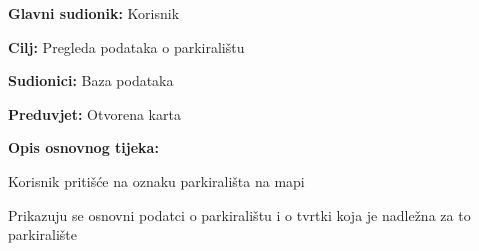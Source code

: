 \noindent {}
\begin{packed_item}
	
	\item \textbf{Glavni sudionik:} Korisnik
	\item \textbf{Cilj:} Pregleda podataka o parkiralištu
	\item \textbf{Sudionici:} Baza podataka
	\item \textbf{Preduvjet:} Otvorena karta
	\item \textbf{Opis osnovnog tijeka:}
	
	\item[] \begin{packed_enum}
		
		\item Korisnik pritišće na oznaku parkirališta na mapi
		\item Prikazuju se osnovni podatci o parkiralištu i o tvrtki koja je nadležna za to parkiralište

	\end{packed_enum}
\end{packed_item}

